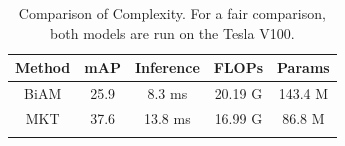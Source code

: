 \begin{table}[t]
\caption{Comparison of Complexity. For a fair comparison, both models are run on the Tesla V100.}
\centering
\footnotesize
\begin{tabular}{ccccc}
\toprule[0.15em]
\textbf{Method} & \textbf{mAP} & \textbf{Inference} & \textbf{FLOPs} & \textbf{Params} \\
\hline
BiAM & 25.9 & 8.3 ms  & 20.19 G & 143.4 M \\
MKT & 37.6 & 13.8 ms & 16.99 G & 86.8 M \\
\toprule[0.15em]
\label{tab:complex}
\end{tabular}
\end{table}